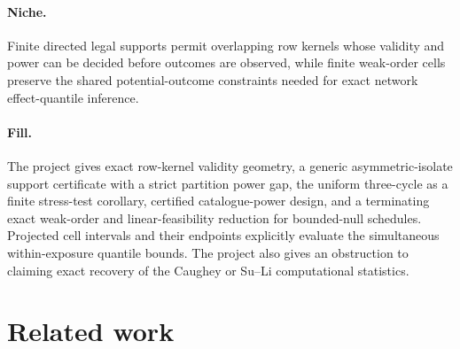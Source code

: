 \documentclass{article}
\begin{document}
\paragraph{Niche.} Finite directed legal supports permit overlapping row kernels whose validity and power can be decided before outcomes are observed, while finite weak-order cells preserve the shared potential-outcome constraints needed for exact network effect-quantile inference.

\paragraph{Fill.} The project gives exact row-kernel validity geometry, a generic asymmetric-isolate support certificate with a strict partition power gap, the uniform three-cycle as a finite stress-test corollary, certified catalogue-power design, and a terminating exact weak-order and linear-feasibility reduction for bounded-null schedules. Projected cell intervals and their endpoints explicitly evaluate the simultaneous within-exposure quantile bounds. The project also gives an obstruction to claiming exact recovery of the Caughey or Su--Li computational statistics.

\section{Related work}
\end{document}
